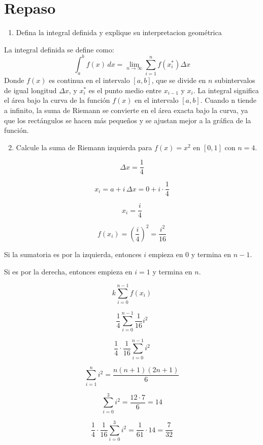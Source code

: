 \section{Repaso}

\begin{enumerate}
    \item Defina la integral definida y explique su interpretacion geométrica
\end{enumerate}

La integral definida se define como:
\[
\int_{a}^{b} f(x) \,dx = \lim_{n \to \infty} \sum_{i=1}^{n} f(x_i^*) \Delta x
\]
Donde $f(x)$ es continua en el intervalo \([a,b]\), que se divide en \(n\) subintervalos de igual longitud \(\Delta x\), y \(x_i^*\) es el punto medio entre \(x_{i-1}\) y \(x_i\).
La integral significa el área bajo la curva de la función \(f(x)\) en el intervalo \([a,b]\). Cuando n tiende a infinito, la suma de Riemann se convierte en el área exacta bajo la curva, ya que los rectángulos se hacen más pequeños y se ajustan mejor a la gráfica de la función.

\begin{enumerate}
    \setcounter{enumi}{1}
    \item Calcule la suma de Riemann izquierda para \( f(x) = x^2 \) en \([0,1]\) con \(n = 4\).
\end{enumerate}

\[
\Delta x = \frac{1}{4}
\]

\[
x_i = a + i\,\Delta x 
    = 0 + i \cdot \frac{1}{4} 
\]

\[
x_i = \frac{i}{4}
\]

\[
f(x_i) = \left(\frac{i}{4}\right)^2 
       = \frac{i^2}{16}
\]

Si la sumatoria es por la izquierda, entonces \(i\) empieza en \(0\) y termina en \(n - 1\). 

Si es por la derecha, entonces empieza en \(i = 1\) y termina en \(n\).

\[
k \sum_{i=0}^{n-1} f(x_i)
\]

\[
\frac{1}{4} \sum_{i=0}^{n-1} \frac{1}{16} i^2
\]

\[
\frac{1}{4} \cdot \frac{1}{16} \sum_{i=0}^{n-1} i^2
\]

\[
\sum_{i=1}^{n} i^2 = \frac{n(n+1)(2n+1)}{6}
\]

\[
\sum_{i=0}^{3} i^2 = \frac{12 \cdot 7}{6} = 14
\]

\[
\frac{1}{4} \cdot \frac{1}{16} \sum_{i=0}^{3} i^2 = \frac{1}{61} \cdot 14 = \frac{7}{32}
\]

